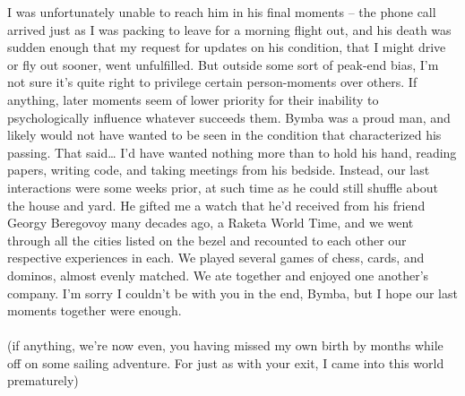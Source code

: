\documentclass[twoside,10pt]{article}
\begin{document}
\begin{article*}
I was unfortunately unable to reach him in his final moments – the phone call arrived just as I was packing to leave for a morning flight out, and his death was sudden enough that my request for updates on his condition, that I might drive or fly out sooner, went unfulfilled. But outside some sort of peak-end bias, I’m not sure it’s quite right to privilege certain person-moments over others. If anything, later moments seem of lower priority for their inability to psychologically influence whatever succeeds them. Bymba was a proud man, and likely would not have wanted to be seen in the condition that characterized his passing. That said… I’d have wanted nothing more than to hold his hand, reading papers, writing code, and taking meetings from his bedside. Instead, our last interactions were some weeks prior, at such time as he could still shuffle about the house and yard. He gifted me a watch that he’d received from his friend Georgy Beregovoy many decades ago, a Raketa World Time, and we went through all the cities listed on the bezel and recounted to each other our respective experiences in each. We played several games of chess, cards, and dominos, almost evenly matched. We ate together and enjoyed one another’s company. I’m sorry I couldn’t be with you in the end, Bymba, but I hope our last moments together were enough.
\\\\
(if anything, we’re now even, you having missed my own birth by months while off on some sailing adventure. For just as with your exit, I came into this world prematurely)
\\\\

\end{article*}
\end{document}
